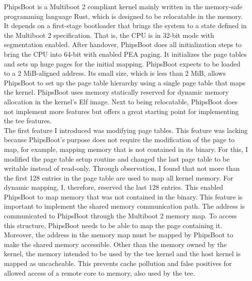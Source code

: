PhipsBoot is a Multiboot 2 compliant kernel mainly written in the memory-safe
programming language Rust, which is designed to be relocatable in the memory. It
depends on a first-stage bootloader that brings the system to a state defined in the Multiboot 2
specification. That is, the CPU is in 32-bit mode with segmentation enabled.
After handover, PhipsBoot does all initialization steps to bring the CPU into
64-bit with enabled PEA paging. It initializes the page tables and sets up huge
pages for the initial mapping. PhipsBoot expects to be loaded to a 2 MiB-aligned
address. Its small size, which is less than 2 MiB, allows PhipsBoot to set up
the page table hierarchy using a single page table that maps the kernel.
PhipsBoot uses memory statically reserved for dynamic memory allocation in the
kernel's Elf image. Next to being relocatable, PhipsBoot does not implement more
features but offers a great starting point for implementing the \gls{tee}
features. \\

The first feature I introduced was modifying page tables. This feature was
lacking because PhipsBoot's purpose does not require the modification of the
page to map, for example, mapping memory that is not contained in its binary.
For this, I modified the page table setup routine and changed the last page
table to be writable instead of read-only. Through observation, I found that not
more than the first 128 entries in the page table are used to map all kernel
memory. For dynamic mapping, I, therefore, reserved the last 128 entries. This
enabled PhipsBoot to map memory that was not contained in the binary. This
feature is important to implement the shared memory communication path. The
address is communicated to PhipsBoot through the Multiboot 2 memory map. To
access this structure, PhipsBoot needs to be able to map the page containing it.
Moreover, the address in the memory map must be mapped by PhipsBoot to make the
shared memory accessible. Other than the memory owned by the kernel, the memory
intended to be used by the \gls{tee} kernel and the host kernel is mapped as
uncacheable. This prevents cache pollution and false positives for allowed
access of a remote core to memory, also used by the \gls{tee}.\\

